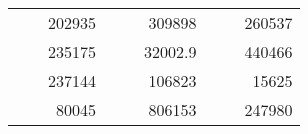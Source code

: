 \begin{table}[]
\begin{tabular}{|ccrccrccc}
\rowcolor[HTML]{DAE8FC} 
\multicolumn{1}{|c|}{\cellcolor[HTML]{FFFFC7}}                                & \multicolumn{1}{c|}{\cellcolor[HTML]{DAE8FC}}                      & \multicolumn{1}{r|}{\cellcolor[HTML]{DAE8FC}202935}    & \multicolumn{1}{c|}{\cellcolor[HTML]{FFFFC7}}                                & \multicolumn{1}{c|}{\cellcolor[HTML]{DAE8FC}}                       & \multicolumn{1}{r|}{\cellcolor[HTML]{DAE8FC}309898}    & \multicolumn{1}{c|}{\cellcolor[HTML]{FFFFC7}}                                & \multicolumn{1}{c|}{\cellcolor[HTML]{DAE8FC}}                      & \multicolumn{1}{r|}{\cellcolor[HTML]{DAE8FC}260537}    \\ \cline{3-3} \cline{6-6} \cline{9-9} 
\multicolumn{1}{|c|}{\cellcolor[HTML]{FFFFC7}}                                & \multicolumn{1}{c|}{\cellcolor[HTML]{DAE8FC}}                      & \multicolumn{1}{r|}{\cellcolor[HTML]{DDFDFF}235175}    & \multicolumn{1}{c|}{\cellcolor[HTML]{FFFFC7}}                                & \multicolumn{1}{c|}{\cellcolor[HTML]{DAE8FC}}                       & \multicolumn{1}{r|}{\cellcolor[HTML]{DDFDFF}32002.9}   & \multicolumn{1}{c|}{\cellcolor[HTML]{FFFFC7}}                                & \multicolumn{1}{c|}{\cellcolor[HTML]{DAE8FC}}                      & \multicolumn{1}{r|}{\cellcolor[HTML]{DDFDFF}440466}    \\ \cline{3-3} \cline{6-6} \cline{9-9} 
\rowcolor[HTML]{DAE8FC} 
\multicolumn{1}{|c|}{\cellcolor[HTML]{FFFFC7}}                                & \multicolumn{1}{c|}{\cellcolor[HTML]{DAE8FC}}                      & \multicolumn{1}{r|}{\cellcolor[HTML]{DAE8FC}237144}    & \multicolumn{1}{c|}{\cellcolor[HTML]{FFFFC7}}                                & \multicolumn{1}{c|}{\cellcolor[HTML]{DAE8FC}}                       & \multicolumn{1}{r|}{\cellcolor[HTML]{DAE8FC}106823}    & \multicolumn{1}{c|}{\cellcolor[HTML]{FFFFC7}}                                & \multicolumn{1}{c|}{\cellcolor[HTML]{DAE8FC}}                      & \multicolumn{1}{r|}{\cellcolor[HTML]{DAE8FC}15625}     \\ \cline{3-3} \cline{6-6} \cline{9-9} 
\multicolumn{1}{|c|}{\cellcolor[HTML]{FFFFC7}}                                & \multicolumn{1}{c|}{\cellcolor[HTML]{DAE8FC}}                      & \multicolumn{1}{r|}{\cellcolor[HTML]{DDFDFF}80045}     & \multicolumn{1}{c|}{\cellcolor[HTML]{FFFFC7}}                                & \multicolumn{1}{c|}{\cellcolor[HTML]{DAE8FC}}                       & \multicolumn{1}{r|}{\cellcolor[HTML]{DDFDFF}806153}    & \multicolumn{1}{c|}{\cellcolor[HTML]{FFFFC7}}                                & \multicolumn{1}{c|}{\cellcolor[HTML]{DAE8FC}}                      & \multicolumn{1}{r|}{\cellcolor[HTML]{DDFDFF}247980}    \\ \cline{3-3} \cline{6-6} \cline{9-9} 

\end{tabular}
\end{table}
